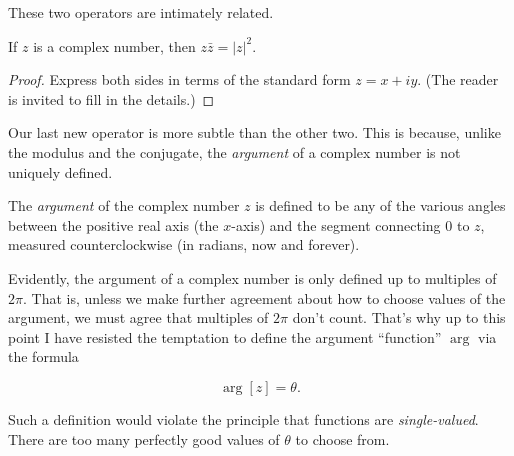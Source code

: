 \documentclass[twocolumn,12pt]{article}
\begin{document}
These two operators are intimately related.
\begin{proposition}
  If $z$ is a complex number, then $z \bar{z} = |z|^2$.
\end{proposition}
\begin{proof}
  Express both sides in terms of the standard form $z = x + iy$. (The reader is invited to fill in the details.)
\end{proof}
Our last new operator is more subtle than the other two. This is because, unlike the modulus and the conjugate, the \emph{argument} of a complex number is not uniquely defined.
\begin{definition}
  The \emph{argument} of the complex number $z$ is defined to be any of the various angles between the positive real axis (the $x$-axis) and the segment connecting $0$ to $z$, measured counterclockwise (in radians, now and forever).
\end{definition}
Evidently, the argument of a complex number is only defined up to multiples of $2\pi$. That is, unless we make further agreement about how to choose values of the argument, we must agree that multiples of $2\pi$ don't count. 
That's why up to this point I have resisted the temptation to define the argument ``function'' $\arg$ via the formula
\begin{gridenv}
  \[
    \arg[z] = \theta.
  \]
\end{gridenv}
Such a definition would violate the principle that functions are \emph{single-valued}. There are too many perfectly good values of $\theta$ to choose from.
\end{document}
